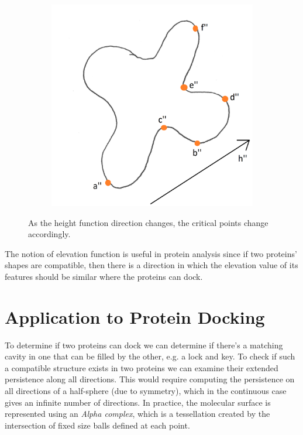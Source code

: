 \documentclass{article}
\begin{document}
\begin{figure}
\begin{subfigure}{0.32\columnwidth}
	\end{subfigure}
	\begin{subfigure}{0.32\columnwidth}
		\centering
		\includegraphics[width=\textwidth]{fig/blobby-molecule-h-diagonal}
	\end{subfigure}
	\caption{\label{fig:elevations} As the height function direction changes, the
	critical points change accordingly.}
\end{figure}

The notion of elevation function is useful in protein analysis since if two proteins' shapes are compatible, then there is a direction in which the elevation value of its features should be similar where the proteins can dock.

\section{Application to Protein Docking}

To determine if two proteins can dock we can determine if there's a matching cavity in one that
can be filled by the other, e.g. a lock and key. To check if such a compatible structure exists
in two proteins we can examine their extended persistence along all directions. This would
require computing the persistence on all directions of a half-sphere (due to symmetry), which in the
continuous case gives an infinite number of directions. In practice, the molecular surface
is represented using an \emph{Alpha complex}, which is a tessellation created by the intersection
of fixed size balls defined at each point.
\end{document}
